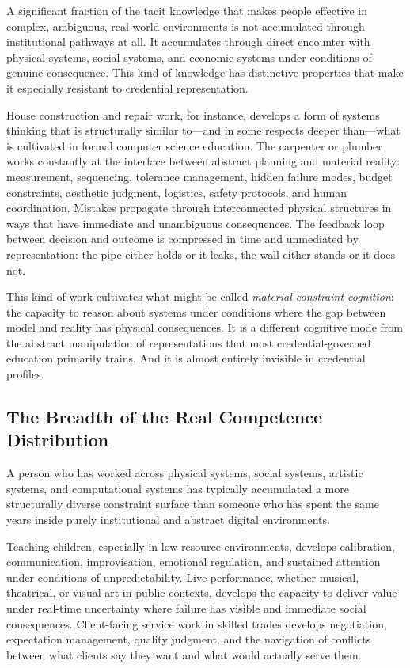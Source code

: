 \documentclass[12pt, a4paper]{article}
\theoremstyle{plain}
\theoremstyle{definition}
\theoremstyle{remark}
\begin{document}
A significant fraction of the tacit knowledge that makes people effective
in complex, ambiguous, real-world environments is not accumulated
through institutional pathways at all.
It accumulates through direct encounter with physical systems,
social systems, and economic systems under conditions of genuine consequence.
This kind of knowledge has distinctive properties that make it especially
resistant to credential representation.

House construction and repair work, for instance, develops a form of systems thinking
that is structurally similar to---and in some respects deeper than---what
is cultivated in formal computer science education.
The carpenter or plumber works constantly at the interface between
abstract planning and material reality: measurement, sequencing,
tolerance management, hidden failure modes, budget constraints,
aesthetic judgment, logistics, safety protocols, and human coordination.
Mistakes propagate through interconnected physical structures
in ways that have immediate and unambiguous consequences.
The feedback loop between decision and outcome is compressed in time
and unmediated by representation: the pipe either holds or it leaks,
the wall either stands or it does not.

This kind of work cultivates what might be called \emph{material constraint cognition}:
the capacity to reason about systems under conditions where
the gap between model and reality has physical consequences.
It is a different cognitive mode from the abstract manipulation of representations
that most credential-governed education primarily trains.
And it is almost entirely invisible in credential profiles.

\subsection{The Breadth of the Real Competence Distribution}

A person who has worked across physical systems, social systems, artistic systems,
and computational systems has typically accumulated a more structurally diverse
constraint surface than someone who has spent the same years
inside purely institutional and abstract digital environments.

Teaching children, especially in low-resource environments,
develops calibration, communication, improvisation, emotional regulation,
and sustained attention under conditions of unpredictability.
Live performance, whether musical, theatrical, or visual art in public contexts,
develops the capacity to deliver value under real-time uncertainty
where failure has visible and immediate social consequences.
Client-facing service work in skilled trades develops negotiation,
expectation management, quality judgment, and the navigation of conflicts
between what clients say they want and what would actually serve them.
\end{document}
